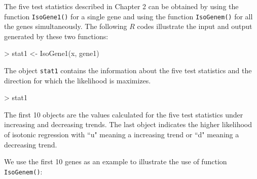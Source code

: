 \documentclass[10pt]{mybook4}
\begin{document}
The five test statistics described in Chapter 2 can be obtained by
using the function \texttt{IsoGene1()} for a single gene and using
the function \texttt{IsoGenem()} for all the genes simultaneously.
The following $R$ codes illustrate the input and output generated by
these two functions:

\begin{Schunk}
\begin{Sinput}
> stat1 <- IsoGene1(x, gene1)
\end{Sinput}
\end{Schunk}

The object \texttt{stat1} contains the information about the five test statistics and the direction for which the likelihood is maximizes.

\begin{Schunk}
\begin{Sinput}
> stat1
\end{Sinput}
\end{Schunk}

The first 10 objects are the values calculated for the five test
statistics under increasing and decreasing trends. The last object
indicates the higher likelihood of isotonic regression with ``u"
meaning a increasing trend or ``d" meaning a decreasing trend.


We use the first 10 genes as an example to illustrate the use of
function \texttt{IsoGenem()}:
\end{document}
